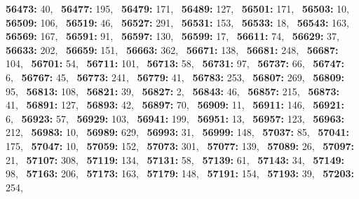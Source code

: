 \textbf{56473:} 40,\allowbreak~ 
\textbf{56477:} 195,\allowbreak~ 
\textbf{56479:} 171,\allowbreak~ 
\textbf{56489:} 127,\allowbreak~ 
\textbf{56501:} 171,\allowbreak~ 
\textbf{56503:} 10,\allowbreak~ 
\textbf{56509:} 106,\allowbreak~ 
\textbf{56519:} 46,\allowbreak~ 
\textbf{56527:} 291,\allowbreak~ 
\textbf{56531:} 153,\allowbreak~ 
\textbf{56533:} 18,\allowbreak~ 
\textbf{56543:} 163,\allowbreak~ 
\textbf{56569:} 167,\allowbreak~ 
\textbf{56591:} 91,\allowbreak~ 
\textbf{56597:} 130,\allowbreak~ 
\textbf{56599:} 17,\allowbreak~ 
\textbf{56611:} 74,\allowbreak~ 
\textbf{56629:} 37,\allowbreak~ 
\textbf{56633:} 202,\allowbreak~ 
\textbf{56659:} 151,\allowbreak~ 
\textbf{56663:} 362,\allowbreak~ 
\textbf{56671:} 138,\allowbreak~ 
\textbf{56681:} 248,\allowbreak~ 
\textbf{56687:} 104,\allowbreak~ 
\textbf{56701:} 54,\allowbreak~ 
\textbf{56711:} 101,\allowbreak~ 
\textbf{56713:} 58,\allowbreak~ 
\textbf{56731:} 97,\allowbreak~ 
\textbf{56737:} 66,\allowbreak~ 
\textbf{56747:} 6,\allowbreak~ 
\textbf{56767:} 45,\allowbreak~ 
\textbf{56773:} 241,\allowbreak~ 
\textbf{56779:} 41,\allowbreak~ 
\textbf{56783:} 253,\allowbreak~ 
\textbf{56807:} 269,\allowbreak~ 
\textbf{56809:} 95,\allowbreak~ 
\textbf{56813:} 108,\allowbreak~ 
\textbf{56821:} 39,\allowbreak~ 
\textbf{56827:} 2,\allowbreak~ 
\textbf{56843:} 46,\allowbreak~ 
\textbf{56857:} 215,\allowbreak~ 
\textbf{56873:} 41,\allowbreak~ 
\textbf{56891:} 127,\allowbreak~ 
\textbf{56893:} 42,\allowbreak~ 
\textbf{56897:} 70,\allowbreak~ 
\textbf{56909:} 11,\allowbreak~ 
\textbf{56911:} 146,\allowbreak~ 
\textbf{56921:} 6,\allowbreak~ 
\textbf{56923:} 57,\allowbreak~ 
\textbf{56929:} 103,\allowbreak~ 
\textbf{56941:} 199,\allowbreak~ 
\textbf{56951:} 13,\allowbreak~ 
\textbf{56957:} 123,\allowbreak~ 
\textbf{56963:} 212,\allowbreak~ 
\textbf{56983:} 10,\allowbreak~ 
\textbf{56989:} 629,\allowbreak~ 
\textbf{56993:} 31,\allowbreak~ 
\textbf{56999:} 148,\allowbreak~ 
\textbf{57037:} 85,\allowbreak~ 
\textbf{57041:} 175,\allowbreak~ 
\textbf{57047:} 10,\allowbreak~ 
\textbf{57059:} 152,\allowbreak~ 
\textbf{57073:} 301,\allowbreak~ 
\textbf{57077:} 139,\allowbreak~ 
\textbf{57089:} 26,\allowbreak~ 
\textbf{57097:} 21,\allowbreak~ 
\textbf{57107:} 308,\allowbreak~ 
\textbf{57119:} 134,\allowbreak~ 
\textbf{57131:} 58,\allowbreak~ 
\textbf{57139:} 61,\allowbreak~ 
\textbf{57143:} 34,\allowbreak~ 
\textbf{57149:} 98,\allowbreak~ 
\textbf{57163:} 206,\allowbreak~ 
\textbf{57173:} 163,\allowbreak~ 
\textbf{57179:} 148,\allowbreak~ 
\textbf{57191:} 154,\allowbreak~ 
\textbf{57193:} 39,\allowbreak~ 
\textbf{57203:} 254,\allowbreak~ 
